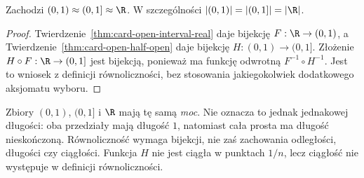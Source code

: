 \begin{wniosek}\label{cor:card-interval-real}
Zachodzi $(0,1)\approx(0,1]\approx\R$.
W szczególności $|(0,1)|=|(0,1]|=|\R|$.
\end{wniosek}
\begin{proof}
Twierdzenie~\ref{thm:card-open-interval-real} daje bijekcję
$F:\R\to(0,1)$, a Twierdzenie~\ref{thm:card-open-half-open}
daje bijekcję $H:(0,1)\to(0,1]$.
Złożenie $H\circ F:\R\to(0,1]$ jest bijekcją,
ponieważ ma funkcję odwrotną $F^{-1}\circ H^{-1}$.
Jest to wniosek z definicji równoliczności, bez stosowania
jakiegokolwiek dodatkowego aksjomatu wyboru.
\end{proof}
\begin{uwaga}
Zbiory $(0,1)$, $(0,1]$ i $\R$ mają tę samą \emph{moc}.
Nie oznacza to jednak jednakowej długości:
oba przedziały mają długość $1$, natomiast cała prosta
ma długość nieskończoną.
Równoliczność wymaga bijekcji,
nie zaś zachowania odległości, długości czy ciągłości.
Funkcja $H$ nie jest ciągła w punktach $1/n$, lecz
ciągłość nie występuje w definicji równoliczności.
\end{uwaga}

